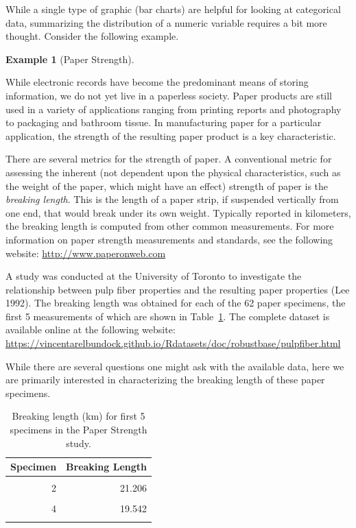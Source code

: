 \documentclass[
  letterpaper,
  DIV=11,
  numbers=noendperiod]{scrreprt}
\theoremstyle{definition}
\newtheorem{example}{Example}[chapter]
\theoremstyle{definition}
\theoremstyle{plain}
\theoremstyle{remark}
\begin{document}
While a single type of graphic (bar charts) are helpful for looking at
categorical data, summarizing the distribution of a numeric variable
requires a bit more thought. Consider the following example.

\begin{example}[Paper
Strength]\protect\hypertarget{exm-summaries-paper}{}\label{exm-summaries-paper}

While electronic records have become the predominant means of storing
information, we do not yet live in a paperless society. Paper products
are still used in a variety of applications ranging from printing
reports and photography to packaging and bathroom tissue. In
manufacturing paper for a particular application, the strength of the
resulting paper product is a key characteristic.

There are several metrics for the strength of paper. A conventional
metric for assessing the inherent (not dependent upon the physical
characteristics, such as the weight of the paper, which might have an
effect) strength of paper is the \emph{breaking length}. This is the
length of a paper strip, if suspended vertically from one end, that
would break under its own weight. Typically reported in kilometers, the
breaking length is computed from other common measurements. For more
information on paper strength measurements and standards, see the
following website: \url{http://www.paperonweb.com}

A study was conducted at the University of Toronto to investigate the
relationship between pulp fiber properties and the resulting paper
properties (Lee 1992). The breaking length was obtained for each of the
62 paper specimens, the first 5 measurements of which are shown in
Table~\ref{tbl-summaries-paper-table}. The complete dataset is available
online at the following website:
\url{https://vincentarelbundock.github.io/Rdatasets/doc/robustbase/pulpfiber.html}

While there are several questions one might ask with the available data,
here we are primarily interested in characterizing the breaking length
of these paper specimens.

\end{example}

\hypertarget{tbl-summaries-paper-table}{}
\begin{table}
\caption{\label{tbl-summaries-paper-table}Breaking length (km) for first 5 specimens in the Paper Strength study. }\tabularnewline

\centering
\begin{tabular}[t]{rr}
\toprule
Specimen & Breaking Length\\
\midrule
\cellcolor{gray!6}{1} & \cellcolor{gray!6}{21.312}\\
2 & 21.206\\
\cellcolor{gray!6}{3} & \cellcolor{gray!6}{20.709}\\
4 & 19.542\\
\cellcolor{gray!6}{5} & \cellcolor{gray!6}{20.449}\\
\bottomrule
\end{tabular}
\end{table}
\end{document}
